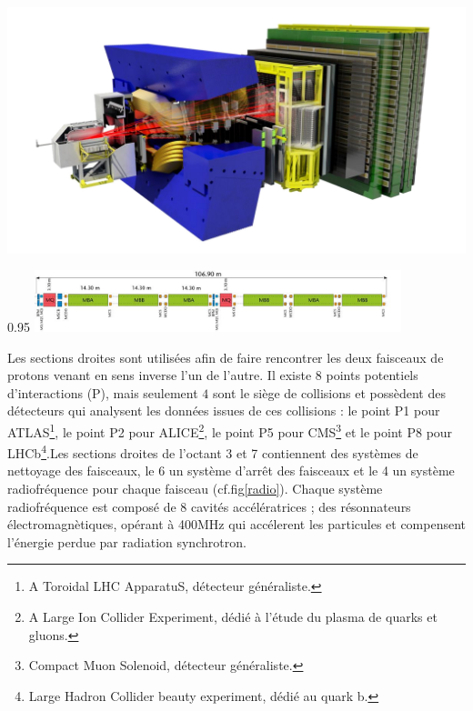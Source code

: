 \marginpar
{
	
	\includegraphics[width=\marginparwidth]{LHC/lhcb.png}
	\label{lhcb}
}
\begin{minipagewithmarginpars}[h]{0.95\textwidth}
	\centering
	\includegraphics[width=0.8\textwidth]{LHC/arc.jpg}
	\label{fodo}	
\end{minipagewithmarginpars}

Les sections droites sont utilisées afin de faire rencontrer les deux faisceaux de protons venant en sens inverse l'un de l'autre. Il existe $8$ points potentiels d'interactions (P), mais seulement $4$ sont le siège de collisions et possèdent des détecteurs qui analysent les données issues de ces collisions : le point P1 pour ATLAS\footnote{A Toroidal LHC ApparatuS, détecteur généraliste.}, le point P2 pour ALICE\footnote{A Large Ion Collider Experiment, dédié à l'étude du plasma de quarks et gluons.}, le point P5 pour CMS\footnote{Compact Muon Solenoid, détecteur généraliste.} et le point P8 pour LHCb\footnote{Large Hadron Collider beauty experiment, dédié au quark b.}.Les sections droites de l'octant 3 et 7 contiennent des systèmes de nettoyage des faisceaux, le 6 un système d'arrêt des faisceaux et le 4 un système radiofréquence pour chaque faisceau (cf.fig\ref{radio}). Chaque système radiofréquence est composé de 8 cavités accélératrices ; des résonnateurs électromagnètiques, opérant à 400MHz qui accélerent les particules et compensent l'énergie perdue par radiation synchrotron.

